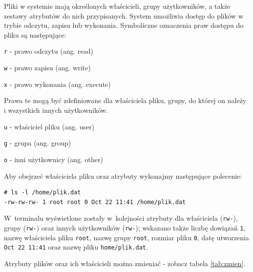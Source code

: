 \begin{example}

Pliki w systemie mają określonych właścicieli, grupy użytkowników, a także zestawy atrybutów do nich przypisanych. System umożliwia dostęp do plików w trybie odczytu, zapisu lub wykonania. Symboliczne oznaczenia praw dostępu do pliku są następujące:

\begin{myitemize}
\item \lstinline[style=MyBashStyle]{r} - prawo odczytu (ang. read)
\item \lstinline[style=MyBashStyle]{w} - prawo zapisu (ang. write)
\item \lstinline[style=MyBashStyle]{x} - prawo wykonania (ang. execute)
\end{myitemize}

Prawa te mogą być zdefiniowane dla właściciela pliku, grupy, do której on należy i wszystkich innych użytkowników.

\begin{myitemize}
\item \lstinline[style=MyBashStyle]{u} - właściciel pliku (ang. user)
\item \lstinline[style=MyBashStyle]{g} - grupa (ang. group)
\item \lstinline[style=MyBashStyle]{o} - inni użytkownicy (ang. other)
\end{myitemize}

Aby obejrzeć właściciela pliku oraz atrybuty wykonajmy następujące polecenie:

\begin{lstlisting}[style=MyBashStyle]
# ls -l /home/plik.dat
-rw-rw-rw- 1 root root 0 Oct 22 11:41 /home/plik.dat
\end{lstlisting}

W~terminalu wyświetlone zostały w~kolejności atrybuty dla właściciela (\lstinline[style=MyBashStyle]{rw-}), grupy (\lstinline[style=MyBashStyle]{rw-}) oraz innych użytkowników (\lstinline[style=MyBashStyle]{rw-}); wskazano także liczbę dowiązań \lstinline[style=MyBashStyle]{1}, nazwę właściciela pliku \lstinline[style=MyBashStyle]{root}, nazwę grupy \lstinline[style=MyBashStyle]{root}, rozmiar pliku \lstinline[style=MyBashStyle]{0}, datę utworzenia \lstinline[style=MyBashStyle]{Oct 22 11:41} oraz nazwę pliku \lstinline[style=MyBashStyle]{home/plik.dat}.


Atrybuty plików oraz ich właścicieli można zmieniać - zobacz tabela \ref{tab:zmien}.


\end{example}
